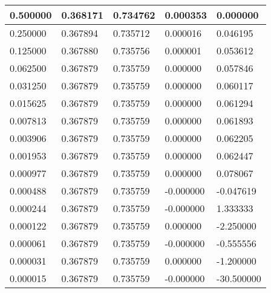 \begin{tabular}{|l|l|l|l|l|}
\hline
0.500000&0.368171&0.734762&0.000353&0.000000\\\hline
0.250000&0.367894&0.735712&0.000016&0.046195\\\hline
0.125000&0.367880&0.735756&0.000001&0.053612\\\hline
0.062500&0.367879&0.735759&0.000000&0.057846\\\hline
0.031250&0.367879&0.735759&0.000000&0.060117\\\hline
0.015625&0.367879&0.735759&0.000000&0.061294\\\hline
0.007813&0.367879&0.735759&0.000000&0.061893\\\hline
0.003906&0.367879&0.735759&0.000000&0.062205\\\hline
0.001953&0.367879&0.735759&0.000000&0.062447\\\hline
0.000977&0.367879&0.735759&0.000000&0.078067\\\hline
0.000488&0.367879&0.735759&-0.000000&-0.047619\\\hline
0.000244&0.367879&0.735759&-0.000000&1.333333\\\hline
0.000122&0.367879&0.735759&0.000000&-2.250000\\\hline
0.000061&0.367879&0.735759&-0.000000&-0.555556\\\hline
0.000031&0.367879&0.735759&0.000000&-1.200000\\\hline
0.000015&0.367879&0.735759&-0.000000&-30.500000\\\hline
\end{tabular}

